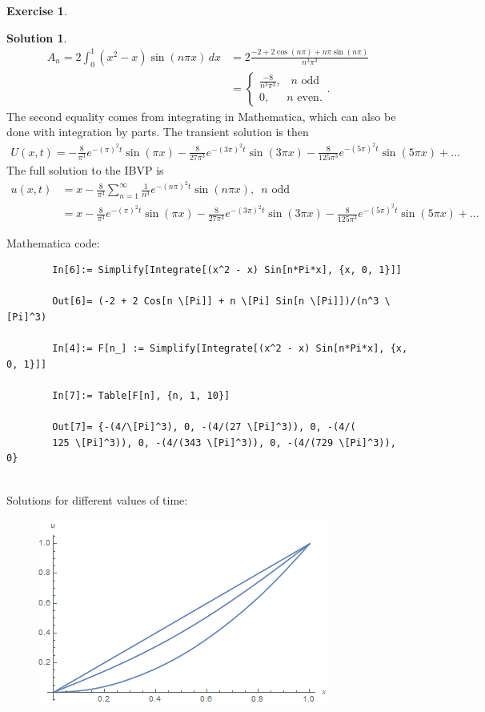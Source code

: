 \documentclass{article}
\theoremstyle{definition}
\newtheorem*{exer*}{Exercise}
\newtheorem*{sln*}{Solution}
\begin{document}
\begin{exer*}
\begin{sln*}
\begin{align*}
		A_n = 2\int_{0}^{1}(x^2 - x)\sin(n\pi x)\,dx &= 2\frac{-2+2\cos(n\pi) + n\pi\sin(n\pi)}{n^3\pi^3}\\
		&= \begin{cases}
		\frac{-8}{n^3\pi^3},\,\,\,\,\, n \text{ odd}\\
		0,\,\,\,\,\,\,\,\,\, n \text{ even}.
		\end{cases}.
		\end{align*}
		The second equality comes from integrating in Mathematica, which can also be done with integration by parts. The transient solution is then
		\begin{align*}
		U(x,t) = -\frac{8}{\pi ^3}e^{-(\pi)^2t} \sin(\pi x)   -\frac{8}{27 \pi ^3}e^{-(3\pi)^2t} \sin(3\pi x)    -\frac{8}{125 \pi ^3}e^{-(5\pi)^2t} \sin(5\pi x)  + \dots
		\end{align*}
		The full solution to the IBVP is
		\begin{align*}
		u(x,t) &= x- \frac{8}{\pi^3}\sum_{n=1}^\infty\frac{1}{n^3}e^{-(n\pi)^2t}\sin(n\pi x),\,\,\, n \text{ odd} \\ 
		&= x -\frac{8}{\pi ^3}e^{-(\pi)^2t} \sin(\pi x)   -\frac{8}{27 \pi ^3}e^{-(3\pi)^2t} \sin(3\pi x)    -\frac{8}{125 \pi ^3}e^{-(5\pi)^2t} \sin(5\pi x)  + \dots
		\end{align*}
		
		\newpage
		
		\noindent Mathematica code:
		\begin{lstlisting}
		In[6]:= Simplify[Integrate[(x^2 - x) Sin[n*Pi*x], {x, 0, 1}]]
		
		Out[6]= (-2 + 2 Cos[n \[Pi]] + n \[Pi] Sin[n \[Pi]])/(n^3 \[Pi]^3)
		
		In[4]:= F[n_] := Simplify[Integrate[(x^2 - x) Sin[n*Pi*x], {x, 0, 1}]]
		
		In[7]:= Table[F[n], {n, 1, 10}]
		
		Out[7]= {-(4/\[Pi]^3), 0, -(4/(27 \[Pi]^3)), 0, -(4/(
		125 \[Pi]^3)), 0, -(4/(343 \[Pi]^3)), 0, -(4/(729 \[Pi]^3)), 0}
		\end{lstlisting}
		$\,$\\
		\noindent Solutions for different values of time:\\
		
		\begin{figure}[h!]
			\centering
			\includegraphics[scale=0.7]{pset2_1.png}
		\end{figure}
		

\end{sln*}
\end{exer*}
\end{document}
